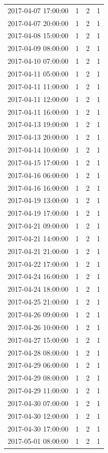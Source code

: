 \begin{tabular}{lrrr}
2017-04-07 17:00:00 & 1 & 2 & 1 \\
2017-04-07 20:00:00 & 1 & 2 & 1 \\
2017-04-08 15:00:00 & 1 & 2 & 1 \\
2017-04-09 08:00:00 & 1 & 2 & 1 \\
2017-04-10 07:00:00 & 1 & 2 & 1 \\
2017-04-11 05:00:00 & 1 & 2 & 1 \\
2017-04-11 11:00:00 & 1 & 2 & 1 \\
2017-04-11 12:00:00 & 1 & 2 & 1 \\
2017-04-11 16:00:00 & 1 & 2 & 1 \\
2017-04-13 19:00:00 & 1 & 2 & 1 \\
2017-04-13 20:00:00 & 1 & 2 & 1 \\
2017-04-14 10:00:00 & 1 & 2 & 1 \\
2017-04-15 17:00:00 & 1 & 2 & 1 \\
2017-04-16 06:00:00 & 1 & 2 & 1 \\
2017-04-16 16:00:00 & 1 & 2 & 1 \\
2017-04-19 13:00:00 & 1 & 2 & 1 \\
2017-04-19 17:00:00 & 1 & 2 & 1 \\
2017-04-21 09:00:00 & 1 & 2 & 1 \\
2017-04-21 14:00:00 & 1 & 2 & 1 \\
2017-04-21 21:00:00 & 1 & 2 & 1 \\
2017-04-22 17:00:00 & 1 & 2 & 1 \\
2017-04-24 16:00:00 & 1 & 2 & 1 \\
2017-04-24 18:00:00 & 1 & 2 & 1 \\
2017-04-25 21:00:00 & 1 & 2 & 1 \\
2017-04-26 09:00:00 & 1 & 2 & 1 \\
2017-04-26 10:00:00 & 1 & 2 & 1 \\
2017-04-27 15:00:00 & 1 & 2 & 1 \\
2017-04-28 08:00:00 & 1 & 2 & 1 \\
2017-04-29 06:00:00 & 1 & 2 & 1 \\
2017-04-29 08:00:00 & 1 & 2 & 1 \\
2017-04-29 11:00:00 & 1 & 2 & 1 \\
2017-04-30 07:00:00 & 1 & 2 & 1 \\
2017-04-30 12:00:00 & 1 & 2 & 1 \\
2017-04-30 17:00:00 & 1 & 2 & 1 \\
2017-05-01 08:00:00 & 1 & 2 & 1 \\

\end{tabular}
